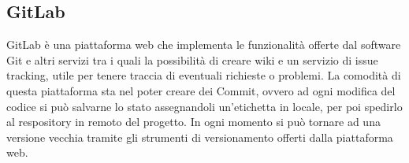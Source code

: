 \subsection{GitLab}
GitLab \`e una piattaforma web che implementa le funzionalit\`a offerte dal software Git e altri
servizi tra i quali la possibilit\`a di creare wiki e un servizio di issue tracking, utile per tenere traccia
di eventuali richieste o problemi.
La comodit\`a di questa piattaforma sta nel poter creare dei Commit, ovvero ad ogni modifica del codice si pu\`o
salvarne lo stato assegnandoli un'etichetta in locale, per poi spedirlo al respository in remoto del progetto.
In ogni momento si pu\`o tornare ad una versione vecchia tramite gli strumenti di versionamento offerti dalla piattaforma web.

